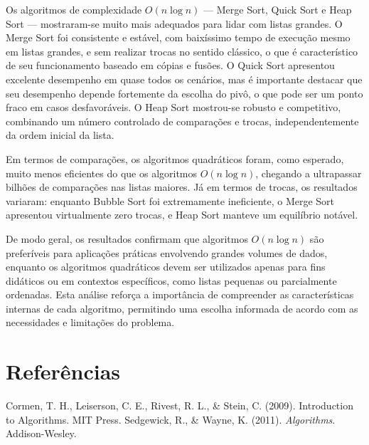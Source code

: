 \documentclass[12pt, a4paper]{report}
\begin{document}
Os algoritmos de complexidade $O(n \log n)$ — Merge Sort, Quick Sort e Heap Sort — mostraram-se muito mais adequados para lidar com listas grandes. O Merge Sort foi consistente e estável, com baixíssimo tempo de execução mesmo em listas grandes, e sem realizar trocas no sentido clássico, o que é característico de seu funcionamento baseado em cópias e fusões. O Quick Sort apresentou excelente desempenho em quase todos os cenários, mas é importante destacar que seu desempenho depende fortemente da escolha do pivô, o que pode ser um ponto fraco em casos desfavoráveis. O Heap Sort mostrou-se robusto e competitivo, combinando um número controlado de comparações e trocas, independentemente da ordem inicial da lista.

Em termos de comparações, os algoritmos quadráticos foram, como esperado, muito menos eficientes do que os algoritmos $O(n \log n)$, chegando a ultrapassar bilhões de comparações nas listas maiores. Já em termos de trocas, os resultados variaram: enquanto Bubble Sort foi extremamente ineficiente, o Merge Sort apresentou virtualmente zero trocas, e Heap Sort manteve um equilíbrio notável.

De modo geral, os resultados confirmam que algoritmos $O(n \log n)$ são preferíveis para aplicações práticas envolvendo grandes volumes de dados, enquanto os algoritmos quadráticos devem ser utilizados apenas para fins didáticos ou em contextos específicos, como listas pequenas ou parcialmente ordenadas. Esta análise reforça a importância de compreender as características internas de cada algoritmo, permitindo uma escolha informada de acordo com as necessidades e limitações do problema.





\chapter*{Referências}


    Cormen, T. H., Leiserson, C. E., Rivest, R. L., \& Stein, C. (2009). 			    {Introduction to Algorithms}. MIT Press.
    Sedgewick, R., \& Wayne, K. (2011). \textit{Algorithms}. Addison-Wesley.
\end{document}

